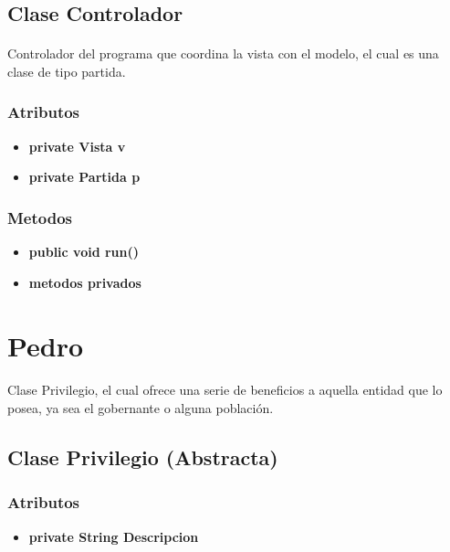 \documentclass[12pt,a4paper]{article}
\begin{document}
        \subsection{Clase Controlador}
        \paragraph{}
        Controlador del programa que coordina la vista con el modelo, el cual es una clase de tipo partida.
        \subsubsection{Atributos}
        \begin{itemize}
            \item \textbf{private Vista v}
            \item \textbf{private Partida p}
        \end{itemize}
        \subsubsection{Metodos}
        \begin{itemize}
            \item \textbf{public void run()}
            \item \textbf{metodos privados}
        \end{itemize}
        
\section{Pedro}
    \paragraph{} 
    Clase Privilegio, el cual ofrece una serie de beneficios a aquella entidad que lo posea, ya sea el gobernante o alguna población.
    \subsection{Clase Privilegio (Abstracta)}
        \subsubsection{Atributos}
            \begin{itemize}
                \item \textbf{private String Descripcion}
            \end{itemize}
\end{document}
